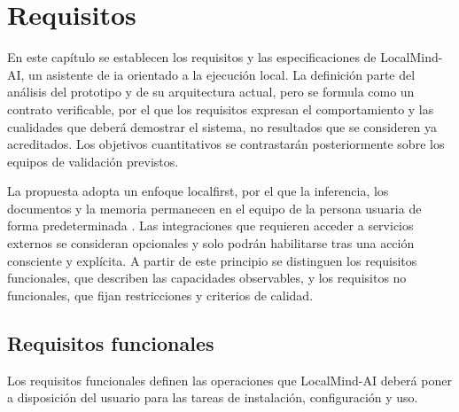 
\section{Requisitos}

En este capítulo se establecen los requisitos y las especificaciones de LocalMind-AI, un asistente de \gls{ia} orientado a la ejecución local. La definición parte del análisis del prototipo y de su arquitectura actual, pero se formula como un contrato verificable, por el que los requisitos expresan el comportamiento y las cualidades que deberá demostrar el sistema, no resultados que se consideren ya acreditados. Los objetivos cuantitativos se contrastarán posteriormente sobre los equipos de validación previstos.

La propuesta adopta un enfoque \gls{localfirst}, por el que la inferencia, los documentos y la memoria permanecen en el equipo de la persona usuaria de forma predeterminada \cite{kleppmann2019local}. Las integraciones que requieren acceder a servicios externos se consideran opcionales y solo podrán habilitarse tras una acción consciente y explícita. A partir de este principio se distinguen los requisitos funcionales, que describen las capacidades observables, y los requisitos no funcionales, que fijan restricciones y criterios de calidad.

\subsection{Requisitos funcionales}

Los requisitos funcionales definen las operaciones que LocalMind-AI deberá poner a disposición del usuario para las tareas de instalación, configuración y uso.

